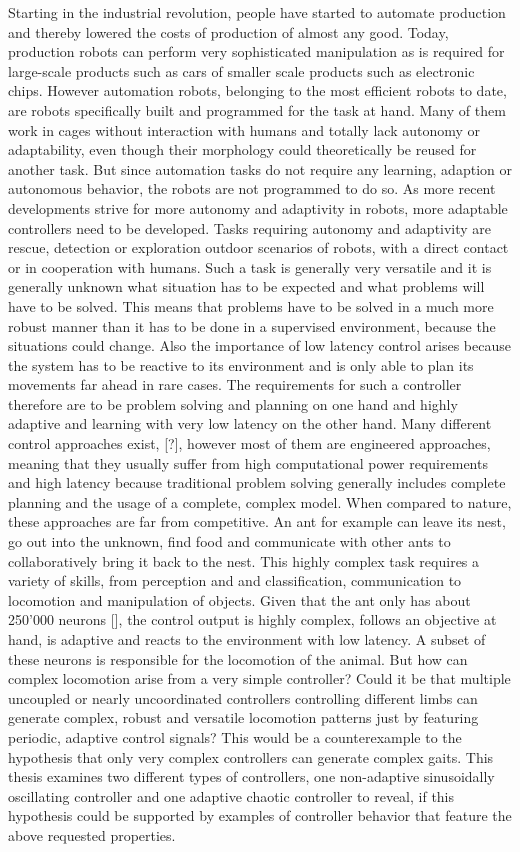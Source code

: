 \documentclass[main]{subfiles}
\begin{document}
Starting in the industrial revolution, people have started to automate production and thereby lowered the costs of production of almost any good. Today, production robots can perform very sophisticated manipulation as is required for large-scale products such as cars of smaller scale products such as electronic chips. However automation robots, belonging to the most efficient robots to date, are robots specifically built and programmed for the task at hand. Many of them work in cages without interaction with humans and totally lack autonomy or adaptability, even though their morphology could theoretically be reused for another task. But since automation tasks do not require any learning, adaption or autonomous behavior, the robots are not programmed to do so. As more recent developments strive for more autonomy and adaptivity in robots, more adaptable controllers need to be developed. Tasks requiring autonomy and adaptivity are rescue, detection or exploration outdoor scenarios of robots, with a direct contact or in cooperation with humans. Such a task is generally very versatile and it is generally unknown what situation has to be expected and what problems will have to be solved. This means that problems have to be solved in a much more robust manner than it has to be done in a supervised environment, because the situations could change. Also the importance of low latency control arises because the system has to be reactive to its environment and is only able to plan its movements far ahead in rare cases. The requirements for such a controller therefore are to be problem solving and planning on one hand and highly adaptive and learning with very low latency on the other hand. Many different control approaches exist, [?], however most of them are engineered approaches, meaning that they usually suffer from high computational power requirements and high latency because traditional problem solving generally includes complete planning and the usage of a complete, complex model. When compared to nature, these approaches are far from competitive. An ant for example can leave its nest, go out into the unknown, find food and communicate with other ants to collaboratively bring it back to the nest. This highly complex task requires a variety of skills, from perception and and classification, communication to locomotion and manipulation of objects. Given that the ant only has about 250'000 neurons [], the control output is highly complex, follows an objective at hand, is adaptive and reacts to the environment with low latency. A subset of these neurons is responsible for the locomotion of the animal. But how can complex locomotion arise from a very simple controller? Could it be that multiple uncoupled or nearly uncoordinated controllers controlling different limbs can generate complex, robust and versatile locomotion patterns just by featuring periodic, adaptive control signals? This would be a counterexample to the hypothesis that only very complex controllers can generate complex gaits. This thesis examines two different types of controllers, one non-adaptive sinusoidally oscillating controller and one adaptive chaotic controller to reveal, if this hypothesis could be supported by examples of controller behavior that feature the above requested properties.
\end{document}
